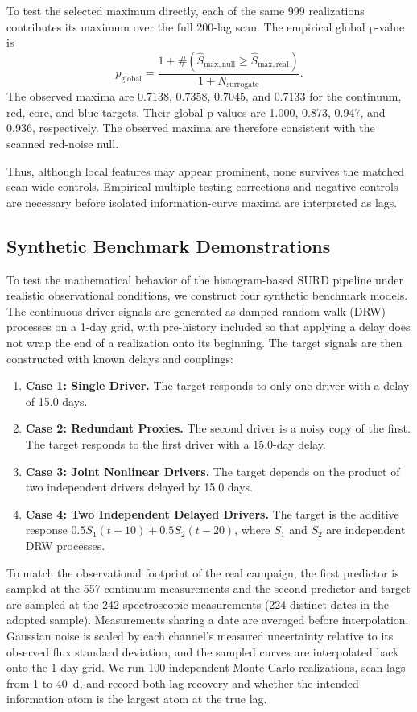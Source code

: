 \documentclass[fleqn,usenatbib]{mnras}
\begin{document}
To test the selected maximum directly, each of the same 999 realizations contributes its maximum over the full 200-lag scan. The empirical global p-value is
\begin{equation}
p_{\mathrm{global}} = \frac{1 + \#(\widehat{S}_{\mathrm{max, null}} \ge \widehat{S}_{\mathrm{max, real}})}{1 + N_{\mathrm{surrogate}}}.
\end{equation}
The observed maxima are $0.7138$, $0.7358$, $0.7045$, and $0.7133$ for the continuum, red, core, and blue targets. Their global p-values are 1.000, 0.873, 0.947, and 0.936, respectively. The observed maxima are therefore consistent with the scanned red-noise null.

Thus, although local features may appear prominent, none survives the matched scan-wide controls. Empirical multiple-testing corrections and negative controls are necessary before isolated information-curve maxima are interpreted as lags.


\subsection{Synthetic Benchmark Demonstrations}
\label{sec:synthetic_benchmarks}
To test the mathematical behavior of the histogram-based SURD pipeline under realistic observational conditions, we construct four synthetic benchmark models. The continuous driver signals are generated as damped random walk (DRW) processes on a 1-day grid, with pre-history included so that applying a delay does not wrap the end of a realization onto its beginning. The target signals are then constructed with known delays and couplings:
\begin{enumerate}
\item \textbf{Case 1: Single Driver.} The target responds to only one driver with a delay of 15.0 days.
\item \textbf{Case 2: Redundant Proxies.} The second driver is a noisy copy of the first. The target responds to the first driver with a 15.0-day delay.
\item \textbf{Case 3: Joint Nonlinear Drivers.} The target depends on the product of two independent drivers delayed by 15.0 days.
\item \textbf{Case 4: Two Independent Delayed Drivers.} The target is the additive response $0.5 S_1(t-10) + 0.5 S_2(t-20)$, where $S_1$ and $S_2$ are independent DRW processes.
\end{enumerate}

To match the observational footprint of the real campaign, the first predictor is sampled at the 557 continuum measurements and the second predictor and target are sampled at the 242 spectroscopic measurements (224 distinct dates in the adopted sample). Measurements sharing a date are averaged before interpolation. Gaussian noise is scaled by each channel's measured uncertainty relative to its observed flux standard deviation, and the sampled curves are interpolated back onto the 1-day grid. We run 100 independent Monte Carlo realizations, scan lags from 1 to 40~d, and record both lag recovery and whether the intended information atom is the largest atom at the true lag.
\end{document}
